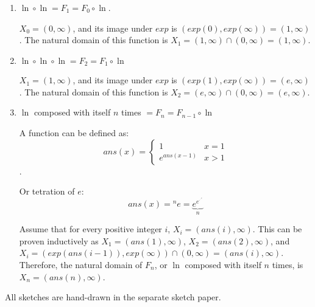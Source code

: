 \documentclass{article}
\begin{document}
\begin{enumerate}
\item $\ln \circ \ln = F_1 = F_0 \circ \ln$.

$X_0 = (0, \infty)$, and its image under $exp$ is $(exp(0), exp(\infty)) = (1, \infty)$. The natural domain of this function is $X_1 = (1, \infty) \cap (0, \infty) = (1, \infty)$.

\item $\ln \circ \ln \circ \ln = F_2 = F_1 \circ \ln$

$X_1 = (1, \infty)$, and its image under $exp$ is $(exp(1), exp(\infty)) = (e, \infty)$. The natural domain of this function is $X_2 = (e, \infty) \cap (0, \infty) = (e, \infty)$.

\item $\ln$ composed with itself $n$ times $= F_n = F_{n - 1} \circ \ln$

A function  can be defined as:
$$ans(x) = \left\{
\begin{array}{lc}
1            & x = 1 \\
e^{ans(x-1)} & x > 1
\end{array}
\right.$$.

Or tetration of $e$:
$$ans(x) = {^{n}e} = \underbrace{e^{e^{\cdot^{\cdot^{e}}}}}_n$$

Assume that for every positive integer $i$, $X_i = (ans(i), \infty)$. This can be proven inductively as $X_1 = (ans(1), \infty)$, $X_2 = (ans(2), \infty)$, and $X_i = (exp(ans(i-1)), exp(\infty)) \cap (0, \infty) = (ans(i), \infty)$. Therefore, the natural domain of $F_n$, or $\ln$ composed with itself $n$ times, is $X_n = (ans(n), \infty)$.
\end{enumerate}

\newcommand \vect[1]{\vec{\mathbf{#1}}}

All sketches are hand-drawn in the separate sketch paper.
\end{document}
